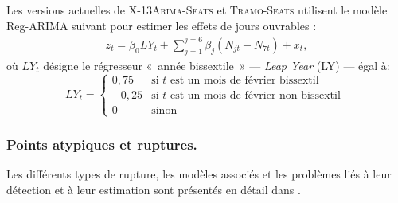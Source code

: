 \documentclass[12pt, a4paper, french]{article}
\begin{document}
Les versions actuelles de \textsc{X-13Arima-Seats} et \textsc{Tramo-Seats} utilisent le modèle Reg-ARIMA suivant pour estimer les effets de jours ouvrables :
\begin{eqnarray}
	\label{eq:eq3}
z_t=\beta_0 LY_t + \sum_{j=1}^{j=6} \beta_j \left(N_{jt} - N_{7t}\right) + x_t,
\end{eqnarray}
où $LY_t$ désigne le régresseur «~année bissextile~» --- \emph{Leap Year} (LY) --- égal à:
\[
LY_{t} = \left\{ \begin{array}{rl} 
                0,75 & \mbox{si } t \mbox{ est un mois de février bissextil } \\
                -0,25 & \mbox{si } t \mbox{ est un mois de février non bissextil } \\
                0 & \mbox{sinon}
               \end{array}
         \right.
\]


\subsubsection{Points atypiques et ruptures.}
\label{sec:PAR}

Les différents types de rupture, les modèles associés et les problèmes liés à leur détection et à leur estimation sont présentés en détail dans \cite{Me2018}.
\end{document}
